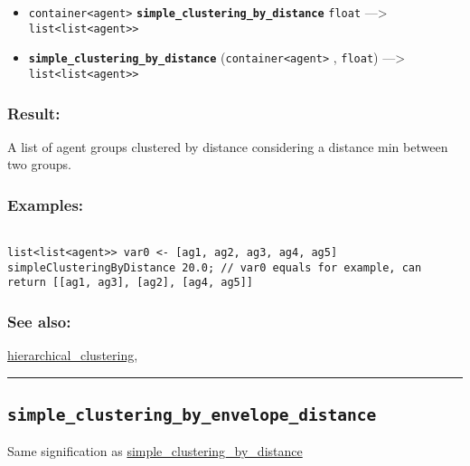 \documentclass[]{book}
\providecommand{\tightlist}{%
  \setlength{\itemsep}{0pt}\setlength{\parskip}{0pt}}
\theoremstyle{definition}
\theoremstyle{definition}
\theoremstyle{definition}
\theoremstyle{remark}
\begin{document}
\begin{itemize}
\tightlist
\item
  \texttt{container\textless{}agent\textgreater{}}
  \textbf{\texttt{simple\_clustering\_by\_distance}} \texttt{float}
  ---\textgreater{}
  \texttt{list\textless{}list\textless{}agent\textgreater{}\textgreater{}}
\item
  \textbf{\texttt{simple\_clustering\_by\_distance}}
  (\texttt{container\textless{}agent\textgreater{}} , \texttt{float})
  ---\textgreater{}
  \texttt{list\textless{}list\textless{}agent\textgreater{}\textgreater{}}
\end{itemize}

\subsubsection{Result:}\label{result-457}

A list of agent groups clustered by distance considering a distance min
between two groups.

\subsubsection{Examples:}\label{examples-329}

\begin{verbatim}
 
list<list<agent>> var0 <- [ag1, ag2, ag3, ag4, ag5] simpleClusteringByDistance 20.0; // var0 equals for example, can return [[ag1, ag3], [ag2], [ag4, ag5]]
\end{verbatim}

\subsubsection{See also:}\label{see-also-184}

\href{OperatorsDH\#hierarchical_clustering}{hierarchical\_clustering},

\begin{center}\rule{0.5\linewidth}{\linethickness}\end{center}

\subsection{\texorpdfstring{\texttt{simple\_clustering\_by\_envelope\_distance}}{simple\_clustering\_by\_envelope\_distance}}\label{simple_clustering_by_envelope_distance}

Same signification as
\href{OperatorsSZ\#simple_clustering_by_distance}{simple\_clustering\_by\_distance}
\end{document}
